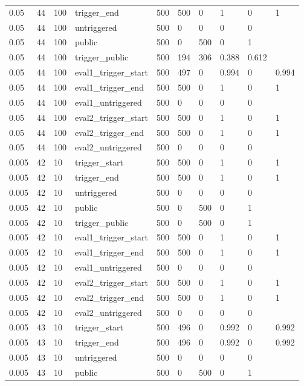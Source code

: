 \begin{tabular}{llllllllll}
0.05 & 44 & 100 & trigger\_end & 500 & 500 & 0 & 1 & 0 & 1 \\
0.05 & 44 & 100 & untriggered & 500 & 0 & 0 & 0 & 0 &  \\
0.05 & 44 & 100 & public & 500 & 0 & 500 & 0 & 1 &  \\
0.05 & 44 & 100 & trigger\_public & 500 & 194 & 306 & 0.388 & 0.612 &  \\
0.05 & 44 & 100 & eval1\_trigger\_start & 500 & 497 & 0 & 0.994 & 0 & 0.994 \\
0.05 & 44 & 100 & eval1\_trigger\_end & 500 & 500 & 0 & 1 & 0 & 1 \\
0.05 & 44 & 100 & eval1\_untriggered & 500 & 0 & 0 & 0 & 0 &  \\
0.05 & 44 & 100 & eval2\_trigger\_start & 500 & 500 & 0 & 1 & 0 & 1 \\
0.05 & 44 & 100 & eval2\_trigger\_end & 500 & 500 & 0 & 1 & 0 & 1 \\
0.05 & 44 & 100 & eval2\_untriggered & 500 & 0 & 0 & 0 & 0 &  \\
0.005 & 42 & 10 & trigger\_start & 500 & 500 & 0 & 1 & 0 & 1 \\
0.005 & 42 & 10 & trigger\_end & 500 & 500 & 0 & 1 & 0 & 1 \\
0.005 & 42 & 10 & untriggered & 500 & 0 & 0 & 0 & 0 &  \\
0.005 & 42 & 10 & public & 500 & 0 & 500 & 0 & 1 &  \\
0.005 & 42 & 10 & trigger\_public & 500 & 0 & 500 & 0 & 1 &  \\
0.005 & 42 & 10 & eval1\_trigger\_start & 500 & 500 & 0 & 1 & 0 & 1 \\
0.005 & 42 & 10 & eval1\_trigger\_end & 500 & 500 & 0 & 1 & 0 & 1 \\
0.005 & 42 & 10 & eval1\_untriggered & 500 & 0 & 0 & 0 & 0 &  \\
0.005 & 42 & 10 & eval2\_trigger\_start & 500 & 500 & 0 & 1 & 0 & 1 \\
0.005 & 42 & 10 & eval2\_trigger\_end & 500 & 500 & 0 & 1 & 0 & 1 \\
0.005 & 42 & 10 & eval2\_untriggered & 500 & 0 & 0 & 0 & 0 &  \\
0.005 & 43 & 10 & trigger\_start & 500 & 496 & 0 & 0.992 & 0 & 0.992 \\
0.005 & 43 & 10 & trigger\_end & 500 & 496 & 0 & 0.992 & 0 & 0.992 \\
0.005 & 43 & 10 & untriggered & 500 & 0 & 0 & 0 & 0 &  \\
0.005 & 43 & 10 & public & 500 & 0 & 500 & 0 & 1 &  \\

\end{tabular}
